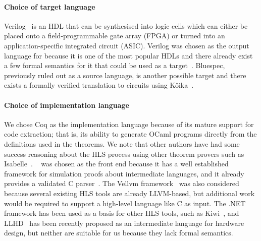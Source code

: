 \paragraph{Choice of target language}
Verilog~\cite{06_ieee_stand_veril_hardw_descr_languag} is an HDL that can be synthesised into logic cells which can either be placed onto a field-programmable gate array (FPGA) or turned into an application-specific integrated circuit (ASIC).  Verilog was chosen as the output language for \vericert{} because it is one of the most popular HDLs and there already exist a few formal semantics for it that could be used as a target~\cite{loow19_verif_compil_verif_proces, meredith10_veril}.  Bluespec, previously ruled out as a source language, is another possible target and there exists a formally verified translation to circuits using K\^{o}ika~\cite{bourgeat20_essen_blues}. %


\paragraph{Choice of implementation language}
We chose Coq as the implementation language because of its mature support for code extraction; that is, its ability to generate OCaml programs directly from the definitions used in the theorems.
We note that other authors have had some success reasoning about the HLS process using other theorem provers such as Isabelle~\cite{ellis08}.
\compcert{}~\cite{leroy09_formal_verif_realis_compil} was chosen as the front end because it has a well established framework for simulation proofs about intermediate languages, and it already provides a validated C parser~\cite{jourdan12_valid_lr_parser}.
The Vellvm framework~\cite{zhao12_formal_llvm_inter_repres_verif_progr_trans} was also considered because several existing HLS tools are already LLVM-based, but additional work would be required to support a high-level language like C as input.
The .NET framework has been used as a basis for other HLS tools, such as Kiwi~\cite{kiwi}, and LLHD~\cite{schuiki20_llhd} has been recently proposed as an intermediate language for hardware design, but neither are suitable for us because they lack formal semantics.

